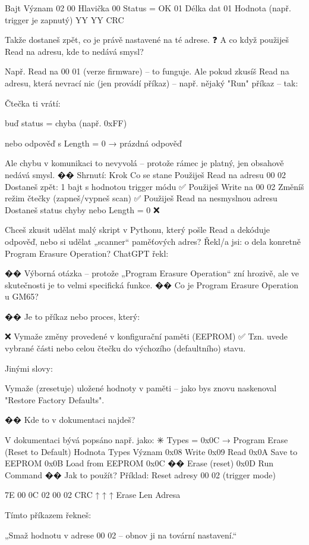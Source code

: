 Bajt	Význam
02 00	Hlavička
00	Status = OK
01	Délka dat
01	Hodnota (např. trigger je zapnutý)
YY YY	CRC

Takže dostaneš zpět, co je právě nastavené na té adrese.
❓ A co když použiješ Read na adresu, kde to nedává smysl?

Např. Read na 00 01 (verze firmware) – to funguje.
Ale pokud zkusíš Read na adresu, která nevrací nic (jen provádí příkaz) – např. nějaký "Run" příkaz – tak:

    Čtečka ti vrátí:

        buď status = chyba (např. 0xFF)

        nebo odpověď s Length = 0 → prázdná odpověď

Ale chybu v komunikaci to nevyvolá – protože rámec je platný, jen obsahově nedává smysl.
�� Shrnutí:
Krok	Co se stane
Použiješ Read na adresu 00 02	Dostaneš zpět: 1 bajt s hodnotou trigger módu ✅
Použiješ Write na 00 02	Změníš režim čtečky (zapneš/vypneš scan) ✅
Použiješ Read na nesmyslnou adresu	Dostaneš status chyby nebo Length = 0 ❌

Chceš zkusit udělat malý skript v Pythonu, který pošle Read a dekóduje odpověď, nebo si udělat „scanner“ paměťových adres?
Řekl/a jsi:
o dela konretně Program Erasure Operation?
ChatGPT řekl:

�� Výborná otázka – protože „Program Erasure Operation“ zní hrozivě, ale ve skutečnosti je to velmi specifická funkce.
�� Co je Program Erasure Operation u GM65?

    �� Je to příkaz nebo proces, který:

    ❌ Vymaže změny provedené v konfigurační paměti (EEPROM)
    ✅ Tzn. uvede vybrané části nebo celou čtečku do výchozího (defaultního) stavu.

Jinými slovy:

    Vymaže (zresetuje) uložené hodnoty v paměti – jako bys znovu naskenoval "Restore Factory Defaults".

�� Kde to v dokumentaci najdeš?

V dokumentaci bývá popsáno např. jako:
✳️ Types = 0x0C → Program Erase (Reset to Default)
Hodnota Types	Význam
0x08	Write
0x09	Read
0x0A	Save to EEPROM
0x0B	Load from EEPROM
0x0C	�� Erase (reset)
0x0D	Run Command
�� Jak to použít?
Příklad: Reset adresy 00 02 (trigger mode)

7E 00 0C 02 00 02 CRC
↑      ↑     ↑
Erase  Len   Adresa

Tímto příkazem řekneš:

    „Smaž hodnotu v adrese 00 02 – obnov ji na tovární nastavení.“

